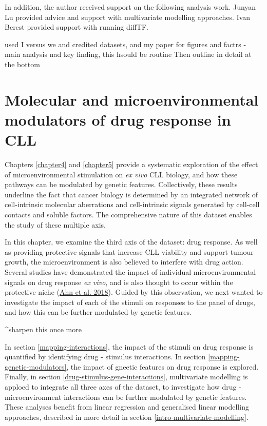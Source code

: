 \documentclass[11pt, a4paper, twosided]{book}
\begin{document}
In addition, the author received support on the following analysis work. Junyan Lu provided advice and support with multivariate modelling approaches. Ivan Berest provided support with running diffTF.

used I versus we and credited datasets, and my paper for figures and factrs - main analysis nad key finding, this hsould be routine
Then outline in detail at the bottom

\hypertarget{chapter6}{%
\chapter{Molecular and microenvironmental modulators of drug response in CLL}\label{chapter6}}

Chapters \ref{chapter4} and \ref{chapter5} provide a systematic exploration of the effect of microenvironmental stimulation on \emph{ex vivo} CLL biology, and how these pathways can be modulated by genetic features. Collectively, these results underline the fact that cancer biology is determined by an integrated network of cell-intrinsic molecular aberrations and cell-intrinsic signals generated by cell-cell contacts and soluble factors. The comprehensive nature of this dataset enables the study of these multiple axis.

In this chapter, we examine the third axis of the dataset: drug response. As well as providing protective signals that increase CLL viability and support tumour growth, the microenvironment is also believed to interfere with drug action. Several studies have demonstrated the impact of individual microenvironmental signals on drug response \emph{ex vivo}, and is also thought to occur within the protective niche (\protect\hyperlink{ref-Ahn2018}{Ahn et al. 2018}). Guided by this observation, we next wanted to investigate the impact of each of the stimuli on responses to the panel of drugs, and how this can be further modulated by genetic features.

\^{}sharpen this once more

In section \ref{mapping-interactions}, the impact of the stimuli on drug response is quantified by identifying drug - stimulus interactions. In section \ref{mapping-genetic-modulators}, the impact of gneetic features on drug response is explored. Finally, in section \ref{drug-stimulus-gene-interactions}, multivariate modelling is apploed to integrate all three axes of the dataset, to investigate how drug - microenvironment interactions can be further modulated by genetic features. These analyses benefit from linear regression and generalised linear modelling approaches, described in more detail in section \ref{intro-multivariate-modelling}.
\end{document}
